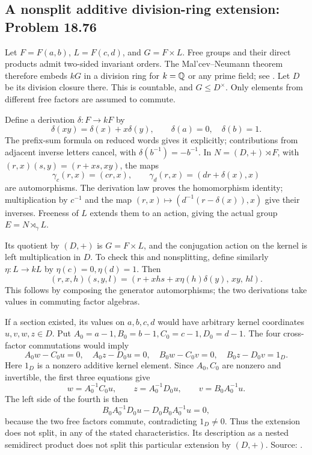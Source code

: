 \subsection{A nonsplit additive division-ring extension: Problem 18.76}
\label{cand:18.76}

Let \(F=F(a,b)\), \(L=F(c,d)\), and \(G=F\times L\).
Free groups and their direct products admit two-sided
invariant orders. The Mal'cev--Neumann theorem therefore
embeds \(kG\) in a division ring for \(k=\mathbb Q\) or any
prime field; see \cite{sakarovitch,bergman}.
Let \(D\) be its division closure there. This is countable,
and \(G\leq D^\times\). Only elements from different
free factors are assumed to commute.

Define a derivation \(\delta:F\to kF\) by
\[
 \delta(xy)=\delta(x)+x\delta(y),\qquad
 \delta(a)=0,\quad\delta(b)=1.
\]
The prefix-sum formula on reduced words gives it
explicitly; contributions from adjacent inverse letters
cancel, with \(\delta(b^{-1})=-b^{-1}\).
In \(N=(D,+)\rtimes F\), with
\((r,x)(s,y)=(r+xs,xy)\), the maps
\[
 \gamma_c(r,x)=(cr,x),\qquad
 \gamma_d(r,x)=(dr+\delta(x),x)
\]
are automorphisms. The derivation law proves the
homomorphism identity; multiplication by \(c^{-1}\) and
the map \((r,x)\mapsto(d^{-1}(r-\delta(x)),x)\) give
their inverses. Freeness of \(L\) extends them to an
action, giving the actual group \(E=N\rtimes_\gamma L\).

Its quotient by \((D,+)\) is \(G=F\times L\), and the
conjugation action on the kernel is left multiplication
in \(D\). To check this and nonsplitting, define similarly
\(\eta:L\to kL\) by \(\eta(c)=0,\eta(d)=1\). Then
\[
 (r,x,h)(s,y,l)
   =(r+xhs+x\eta(h)\delta(y),\,xy,\,hl).
\]
This follows by composing the generator automorphisms;
the two derivations take values in commuting factor
algebras.

If a section existed, its values on \(a,b,c,d\) would
have arbitrary kernel coordinates \(u,v,w,z\in D\).
Put \(A_0=a-1,B_0=b-1,C_0=c-1,D_0=d-1\).
The four cross-factor commutations would imply
\[
 A_0w-C_0u=0,\quad A_0z-D_0u=0,\quad
 B_0w-C_0v=0,\quad B_0z-D_0v=1_D.
\]
Here \(1_D\) is a nonzero additive kernel element.
Since \(A_0,C_0\) are nonzero and invertible,
the first three equations give
\[
 w=A_0^{-1}C_0u,\qquad
 z=A_0^{-1}D_0u,\qquad
 v=B_0A_0^{-1}u.
\]
The left side of the fourth is then
\[
 B_0A_0^{-1}D_0u-D_0B_0A_0^{-1}u=0,
\]
because the two free factors commute, contradicting
\(1_D\ne0\). Thus the extension does not split, in any
of the stated characteristics. Its description as a
nested semidirect product does not split this particular
extension by \((D,+)\). Source:
.

